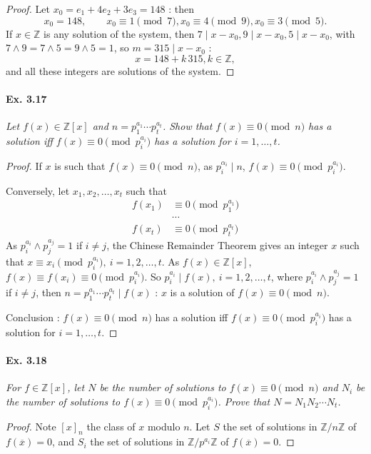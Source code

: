 \documentclass[11pt,a4paper]{article}
\newcommand{\Z}{\mathbb{Z}}
\begin{document}
{\begin{proof}
Let $x_0 = e_1 + 4 e_2 + 3 e_3 = 148 $ : then 
$$x_0 = 148,\qquad x_0 \equiv 1 \pmod 7, x_0 \equiv 4 \pmod 9, x_0 \equiv 3 \pmod 5.$$
If $x\in \Z$ is any solution of the system, then $7 \mid x-x_0, 9 \mid x-x_0, 5 \mid x-x_0$, with $7\wedge 9 = 7 \wedge 5 = 9 \wedge 5 = 1$, so $m = 315 \mid x - x_0$ : 
$$x = 148 + k\, 315, k \in \Z,$$
and all these integers are solutions of the system.
\end{proof}

\paragraph{Ex. 3.17}

{\it Let $f(x) \in \Z[x]$ and $n = p_1^{a_1} \cdots p_t^{a_t}$. Show that $f(x) \equiv 0 \pmod n$ has a solution iff $f(x) \equiv 0 \pmod {p_i^{a_i}}$ has a solution for $i = 1, \ldots, t$.
}

\begin{proof}
If $x$ is such that $f(x) \equiv 0 \pmod n$, as $p_i^{\alpha_i} \mid n$, $f(x) \equiv 0 \pmod{p_i^{a_i}}$.

Conversely, let $x_1,x_2,\ldots,x_t$ such that
\begin{align*}
f(x_1)&\equiv 0 \pmod{p_1^{a_1}}\\
&\cdots\\
f(x_t)&\equiv 0 \pmod{p_t^{a_t}}
\end{align*}
As $p_i^{a_i} \wedge p_j^{a_j}=1$ if $i\ne j$, the Chinese Remainder Theorem gives an integer $x$ such that $x\equiv x_i \pmod {p_i^{a_i}},\ i=1,2,\ldots,t$. As $f(x)\in \Z[x]$, $f(x) \equiv f(x_i) \equiv 0 \pmod {p_i^{a_i}}$. So $p_i^{a_i} \mid f(x),\ i=1,2,\ldots,t$, where $p_i^{a_i} \wedge p_j^{a_j}=1$ if $i\ne j$, then $n = p_1^{a_1} \cdots p_t^{a_t} \mid f(x)$ : $x$ is a solution of $f(x) \equiv 0 \pmod n$.

Conclusion : $f(x) \equiv 0 \pmod n$ has a solution iff $f(x) \equiv 0 \pmod {p_i^{a_i}}$ has a solution for $i = 1, \ldots, t$.
\end{proof}

\paragraph{Ex. 3.18}

{\it For $f \in \Z[x]$, let $N$ be the number of solutions to $f(x) \equiv 0 \pmod n$ and $N_i$ be the number of solutions to $f(x) \equiv 0 \pmod {p_i^{a_i}}$. Prove that $N = N_1N_2\cdots N_t$.
}

\begin{proof}
Note $[x]_n$ the class of $x$ modulo $n$. Let $S$ the set of solutions in $\Z/n\Z$ of $f(\overline{x}) = 0$, and $S_i$ the set of solutions in $\Z/p^{a_i}\Z$ of $f(\overline{x}) = 0$.


\end{proof}}
\end{document}
